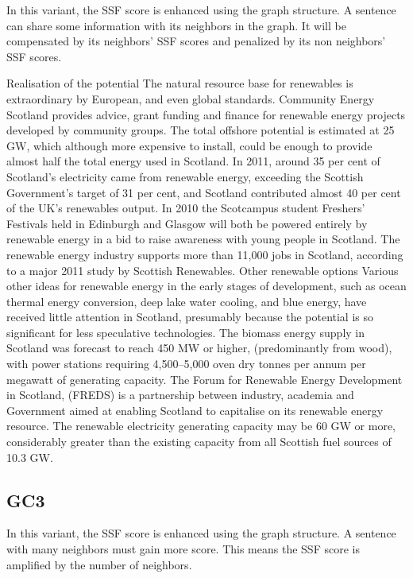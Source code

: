 In this variant, the SSF score is enhanced using the graph structure. 
A sentence can share some information with its neighbors in the graph. 
It will be compensated by its neighbors' SSF scores and penalized by its non neighbors' SSF scores. 

\begin{tcolorbox}\footnotesize
	Realisation of the potential The natural resource base for renewables is extraordinary by European, and even global standards.
	Community Energy Scotland provides advice, grant funding and finance for renewable energy projects developed by community groups.
	The total offshore potential is estimated at 25 GW, which although more expensive to install, could be enough to provide almost half the total energy used in Scotland.
	In 2011, around 35 per cent of Scotland’s electricity came from renewable energy, exceeding the Scottish Government’s target of 31 per cent, and Scotland contributed almost 40 per cent of the UK’s renewables output.
	In 2010 the Scotcampus student Freshers' Festivals held in Edinburgh and Glasgow will both be powered entirely by renewable energy in a bid to raise awareness with young people in Scotland.
	The renewable energy industry supports more than 11,000 jobs in Scotland, according to a major 2011 study by Scottish Renewables.
	Other renewable options Various other ideas for renewable energy in the early stages of development, such as ocean thermal energy conversion, deep lake water cooling, and blue energy, have received little attention in Scotland, presumably because the potential is so significant for less speculative technologies.
	The biomass energy supply in Scotland was forecast to reach 450 MW or higher, (predominantly from wood), with power stations requiring 4,500–5,000 oven dry tonnes per annum per megawatt of generating capacity.
	The Forum for Renewable Energy Development in Scotland, (FREDS) is a partnership between industry, academia and Government aimed at enabling Scotland to capitalise on its renewable energy resource.
	The renewable electricity generating capacity may be 60 GW or more, considerably greater than the existing capacity from all Scottish fuel sources of 10.3 GW.
\end{tcolorbox}

\subsection{GC3}

In this variant, the SSF score is enhanced using the graph structure. 
A sentence with many neighbors must gain more score. 
This means the SSF score is amplified by the number of neighbors.

